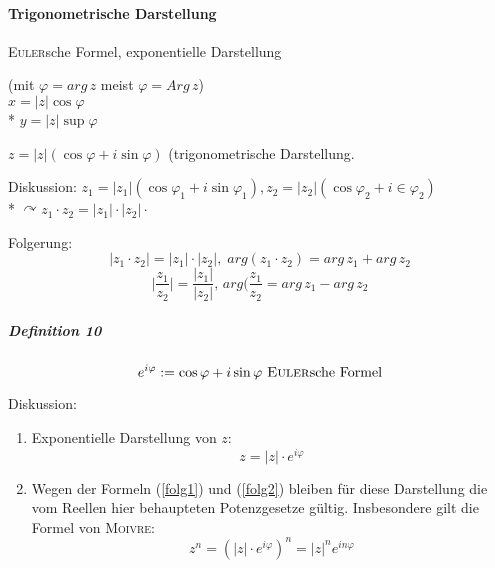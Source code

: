 \documentclass[a4paper]{scrartcl}
\begin{document}
\paragraph{Trigonometrische Darstellung}\textsc{Euler}sche Formel, exponentielle Darstellung\\
 (mit $\varphi = arg\, z$ meist $\varphi = Arg\, z$)\\
$x=\lvert z\rvert \cos{\varphi}$\\*%
$y=\lvert z \rvert \sup{\varphi}$%

$z=\lvert z \rvert (\cos{\varphi} + i \sin{\varphi})$ (trigonometrische Darstellung.

Diskussion: $z_1 = \lvert z_1 \rvert (\cos{\varphi_1} + i \sin{\varphi_1}), z_2 = \lvert z_2 \rvert (\cos{\varphi_2} + i \in{\varphi_2})$\\*
$\curvearrowright z_1 \cdot z_2 = \lvert z_1\rvert \cdot \lvert z_2 \rvert \cdot $

Folgerung:
\begin{equation}\label{folg1}
\lvert z_1 \cdot z_2 \rvert = \lvert z_1 \rvert \cdot \lvert z_2 \rvert, \; arg(z_1 \cdot z_2 ) = arg\, z_1 + arg\, z_2
\end{equation}
\begin{equation}\label{folg2}
\lvert \frac{z_1}{z_2} \rvert = \frac{\lvert z_1\rvert}{\lvert z_2 \rvert}, \, arg(\frac{z_1}{z_2}= arg\, z_1 - arg\, z_2
\end{equation}

\subparagraph{Definition 10}
\[e^{i\varphi} := \cos{\varphi} + i \sin{\varphi}\text{ \textsc{Euler}sche Formel}\]

Diskussion:
\begin{enumerate}
\item Exponentielle Darstellung von $z$:
\[ z = \lvert z \rvert \cdot e^{i\varphi}\]
\item Wegen der Formeln (\ref{folg1}) und (\ref{folg2}) bleiben für diese Darstellung die vom Reellen hier behaupteten Potenzgesetze gültig. Insbesondere gilt die Formel von \textsc{Moivre}:
\[ z^n = (\lvert z \rvert \cdot e^{i \varphi})^n = \lvert z \rvert^n e^{in\varphi}\]
\end{enumerate}
\end{document}
